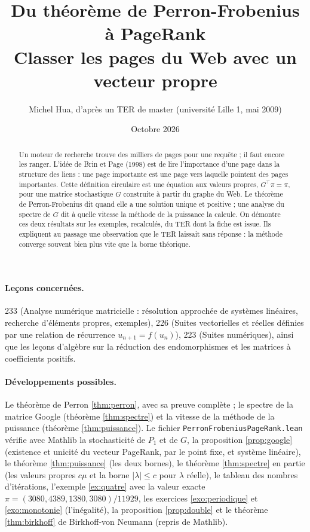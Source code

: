 \documentclass[11pt,a4paper]{article}
\title{Du théorème de Perron-Frobenius à PageRank\\[2pt]
\large Classer les pages du Web avec un vecteur propre}
\author{Michel Hua, d'après un TER de master (université Lille 1, mai 2009)}
\date{Octobre 2026}
\theoremstyle{plain}
\theoremstyle{definition}
\theoremstyle{remark}
\begin{document}
\maketitle

\begin{abstract}
Un moteur de recherche trouve des milliers de pages pour une requête ; il faut encore les ranger. L'idée de Brin et Page (1998) est de lire l'importance d'une page dans la structure des liens : une page importante est une page vers laquelle pointent des pages importantes. Cette définition circulaire est une équation aux valeurs propres, $G^\top\pi=\pi$, pour une matrice stochastique $G$ construite à partir du graphe du Web. Le théorème de Perron-Frobenius dit quand elle a une solution unique et positive ; une analyse du spectre de $G$ dit à quelle vitesse la méthode de la puissance la calcule. On démontre ces deux résultats sur les exemples, recalculés, du TER dont la fiche est issue. Ils expliquent au passage une observation que le TER laissait sans réponse : la méthode converge souvent bien plus vite que la borne théorique.
\end{abstract}

\paragraph{Leçons concernées.} 233 (Analyse numérique matricielle : résolution approchée de systèmes linéaires, recherche d'éléments propres, exemples), 226 (Suites vectorielles et réelles définies par une relation de récurrence $u_{n+1}=f(u_n)$), 223 (Suites numériques), ainsi que les leçons d'algèbre sur la réduction des endomorphismes et les matrices à coefficients positifs.

\paragraph{Développements possibles.} Le théorème de Perron \ref{thm:perron}, avec sa preuve complète ; le spectre de la matrice Google (théorème \ref{thm:spectre}) et la vitesse de la méthode de la puissance (théorème \ref{thm:puissance}). Le fichier \texttt{PerronFrobeniusPageRank.lean} vérifie avec Mathlib la stochasticité de $P_1$ et de $G$, la proposition \ref{prop:google} (existence et unicité du vecteur PageRank, par le point fixe, et système linéaire), le théorème \ref{thm:puissance} (les deux bornes), le théorème \ref{thm:spectre} en partie (les valeurs propres $c\mu$ et la borne $|\lambda|\leq c$ pour $\lambda$ réelle), le tableau des nombres d'itérations, l'exemple \ref{ex:quatre} avec la valeur exacte $\pi=(3080,4389,1380,3080)/11929$, les exercices \ref{exo:periodique} et \ref{exo:monotonie} (l'inégalité), la proposition \ref{prop:double} et le théorème \ref{thm:birkhoff} de Birkhoff-von Neumann (repris de Mathlib).
\end{document}
